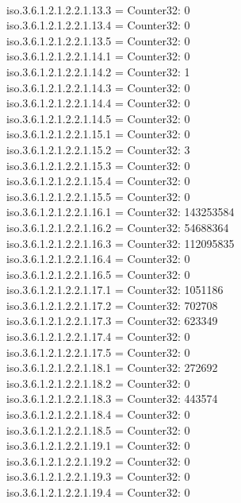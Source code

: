 \documentclass[a4paper,titlepage]{article}
\begin{document}
\begin{center}
{\\iso.3.6.1.2.1.2.2.1.13.3 = Counter32: 0
\\iso.3.6.1.2.1.2.2.1.13.4 = Counter32: 0
\\iso.3.6.1.2.1.2.2.1.13.5 = Counter32: 0
\\iso.3.6.1.2.1.2.2.1.14.1 = Counter32: 0
\\iso.3.6.1.2.1.2.2.1.14.2 = Counter32: 1
\\iso.3.6.1.2.1.2.2.1.14.3 = Counter32: 0
\\iso.3.6.1.2.1.2.2.1.14.4 = Counter32: 0
\\iso.3.6.1.2.1.2.2.1.14.5 = Counter32: 0
\\iso.3.6.1.2.1.2.2.1.15.1 = Counter32: 0
\\iso.3.6.1.2.1.2.2.1.15.2 = Counter32: 3
\\iso.3.6.1.2.1.2.2.1.15.3 = Counter32: 0
\\iso.3.6.1.2.1.2.2.1.15.4 = Counter32: 0
\\iso.3.6.1.2.1.2.2.1.15.5 = Counter32: 0
\\iso.3.6.1.2.1.2.2.1.16.1 = Counter32: 143253584
\\iso.3.6.1.2.1.2.2.1.16.2 = Counter32: 54688364
\\iso.3.6.1.2.1.2.2.1.16.3 = Counter32: 112095835
\\iso.3.6.1.2.1.2.2.1.16.4 = Counter32: 0
\\iso.3.6.1.2.1.2.2.1.16.5 = Counter32: 0
\\iso.3.6.1.2.1.2.2.1.17.1 = Counter32: 1051186
\\iso.3.6.1.2.1.2.2.1.17.2 = Counter32: 702708
\\iso.3.6.1.2.1.2.2.1.17.3 = Counter32: 623349
\\iso.3.6.1.2.1.2.2.1.17.4 = Counter32: 0
\\iso.3.6.1.2.1.2.2.1.17.5 = Counter32: 0
\\iso.3.6.1.2.1.2.2.1.18.1 = Counter32: 272692
\\iso.3.6.1.2.1.2.2.1.18.2 = Counter32: 0
\\iso.3.6.1.2.1.2.2.1.18.3 = Counter32: 443574
\\iso.3.6.1.2.1.2.2.1.18.4 = Counter32: 0
\\iso.3.6.1.2.1.2.2.1.18.5 = Counter32: 0
\\iso.3.6.1.2.1.2.2.1.19.1 = Counter32: 0
\\iso.3.6.1.2.1.2.2.1.19.2 = Counter32: 0
\\iso.3.6.1.2.1.2.2.1.19.3 = Counter32: 0
\\iso.3.6.1.2.1.2.2.1.19.4 = Counter32: 0
}
\end{center}
\end{document}
